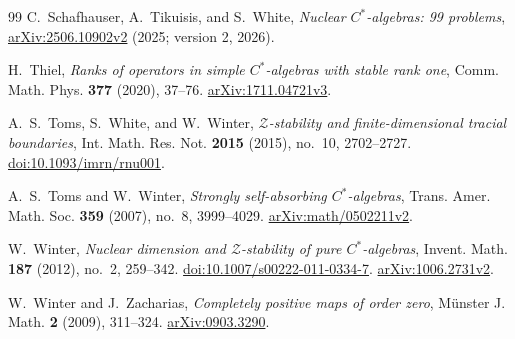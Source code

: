 \begin{thebibliography}{99}
C.~Schafhauser, A.~Tikuisis, and S.~White,
\emph{Nuclear \(C^*\)-algebras: 99 problems},
\href{https://arxiv.org/abs/2506.10902v2}{arXiv:2506.10902v2}
(2025; version 2, 2026).

H.~Thiel,
\emph{Ranks of operators in simple $C^*$-algebras with stable rank one},
Comm. Math. Phys. \textbf{377} (2020), 37--76.
\href{https://arxiv.org/abs/1711.04721v3}{arXiv:1711.04721v3}.

A.~S.~Toms, S.~White, and W.~Winter,
\emph{$\mathcal Z$-stability and finite-dimensional tracial boundaries},
Int. Math. Res. Not. \textbf{2015} (2015), no.~10, 2702--2727.
\href{https://doi.org/10.1093/imrn/rnu001}{doi:10.1093/imrn/rnu001}.

A.~S.~Toms and W.~Winter,
\emph{Strongly self-absorbing \(C^*\)-algebras},
Trans. Amer. Math. Soc. \textbf{359} (2007), no.~8, 3999--4029.
\href{https://arxiv.org/abs/math/0502211v2}{arXiv:math/0502211v2}.

W.~Winter, \emph{Nuclear dimension and $\mathcal Z$-stability of pure $C^*$-algebras},
Invent. Math. \textbf{187} (2012), no.~2, 259--342.
\href{https://doi.org/10.1007/s00222-011-0334-7}{doi:10.1007/s00222-011-0334-7}.
\href{https://arxiv.org/abs/1006.2731v2}{arXiv:1006.2731v2}.

W.~Winter and J.~Zacharias,
\emph{Completely positive maps of order zero},
M\"unster J. Math. \textbf{2} (2009), 311--324.
\href{https://arxiv.org/abs/0903.3290}{arXiv:0903.3290}.

\end{thebibliography}
